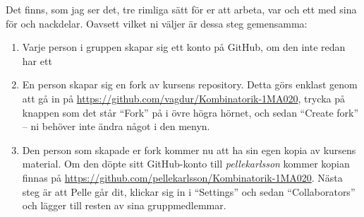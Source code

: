 \documentclass{tufte-handout}
\begin{document}
Det finns, som jag ser det, tre rimliga sätt för er att arbeta, var och ett med sina för och nackdelar. Oavsett vilket ni väljer är dessa steg gemensamma:
\begin{enumerate}
	\item Varje person i gruppen skapar sig ett konto på GitHub, om den inte redan har ett
	\item En person skapar sig en fork av kursens repository. Detta görs enklast genom att gå in på \url{https://github.com/vagdur/Kombinatorik-1MA020}, trycka på knappen som det står ``Fork'' på i övre högra hörnet, och sedan ``Create fork'' -- ni behöver inte ändra något i den menyn.
	\item Den person som skapade er fork kommer nu att ha sin egen kopia av kursens material. Om den döpte sitt GitHub-konto till \emph{pellekarlsson} kommer kopian finnas på \url{https://github.com/pellekarlsson/Kombinatorik-1MA020}. Nästa steg är att Pelle går dit, klickar sig in i ``Settings'' och sedan ``Collaborators'' och lägger till resten av sina gruppmedlemmar. 
\end{enumerate}
\end{document}

